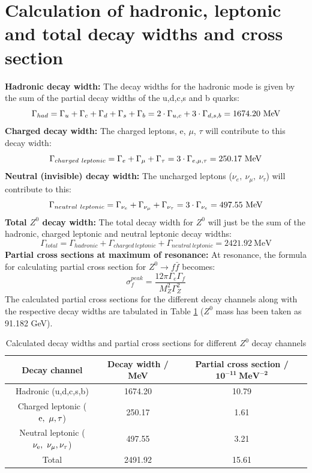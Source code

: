 \section{Calculation of hadronic, leptonic and total decay widths and cross section}
\textbf{Hadronic decay width:} The decay widths for the hadronic mode is given by the sum of the partial decay widths of the u,d,c,s and b quarks: $$\Gamma_{had}=\Gamma_{u}+\Gamma_{c}+\Gamma_{d}+\Gamma_{s}+\Gamma_{b}=2\cdot\Gamma_{u,c}+3\cdot\Gamma_{d,s,b}=1674.20\ \rm{MeV}$$
\textbf{Charged decay width:} The charged leptons, e, $\mu$, $\tau$ will contribute to this decay width: $$\Gamma_{charged \ leptonic}=\Gamma_{e}+\Gamma_{\mu}+\Gamma_{\tau}=3\cdot \Gamma_{e,\mu,\tau}=250.17\ \rm{MeV}$$
\textbf{Neutral (invisible) decay width:} The uncharged leptons ($\nu_{e}, \ \nu_{\mu}, \ \nu_{\tau}$) will contribute to this: $$\Gamma_{neutral \ leptonic}=\Gamma_{\nu_e}+\Gamma_{\nu_\mu}+\Gamma_{\nu_\tau}=3\cdot\Gamma_{\nu_e}=497.55 \ \rm{MeV}$$
\textbf{Total $Z^{0}$ decay width:} The total decay width for $Z^{0}$ will just be the sum of the hadronic, charged leptonic and neutral leptonic decay widths: $$\Gamma_{total}=\Gamma_{hadronic}+\Gamma_{charged \ leptonic}+\Gamma_{neutral \ leptonic}=2421.92 \ \mathrm{MeV}$$
\textbf{Partial cross sections at maximum of resonance:} At resonance, the formula for calculating partial cross section for $Z^{0}\rightarrow f\bar{f}$ becomes:
\begin{equation}
\sigma_{f}^{peak}=\dfrac{12\pi \Gamma_{e}\Gamma_{f}}{M_{Z}^{2}\Gamma_{Z}^{2}}
\end{equation}
The calculated partial cross sections for the different decay channels along with the respective decay widths are tabulated in Table \ref{totdecay} ($Z^{0}$ mass has been taken as  91.182 GeV).

\begin{table}[h!]
\centering
\begin{tabular}{|c|c|c|}
\hline
\textbf{Decay channel} & \textbf{Decay width / MeV} & \textbf{Partial cross section / } $\mathbf{10^{-11}\ MeV^{-2}}$\\
\hline
Hadronic (u,d,c,s,b) & 1674.20 & 10.79\\
\hline
Charged leptonic ($\rm{e, \ \mu, \tau }$) & 250.17 & 1.61\\
\hline
Neutral leptonic ($\rm{\nu_{e}, \ \nu_{\mu}, \nu_{\tau} }$) & 497.55 & 3.21\\
\hline
Total & 2491.92 & 15.61\\
\hline
\end{tabular}
\caption{Calculated decay widths and partial cross sections for different $Z^{0}$ decay channels}
\label{totdecay}
\end{table}

